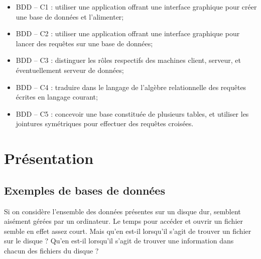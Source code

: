 \documentclass[10pt]{article}
\newif\ifxp
\begin{document}
\ifxp

\else

\fi



 \renewcommand{\baselinestretch}{1.2}
\setlength{\parskip}{2ex plus 0.5ex minus 0.2ex}

\vspace{.5cm}

\begin{savoir}
\begin{itemize}
\item BDD -- C1 : utiliser une application offrant une interface graphique pour créer une base de données et l’alimenter;
\item BDD -- C2 : utiliser une application offrant une interface graphique pour lancer des requêtes sur une base de données;
\item BDD -- C3 : distinguer les rôles respectifs des machines client, serveur, et éventuellement serveur de données;
\item BDD -- C4 : traduire dans le langage de l’algèbre relationnelle des requêtes écrites en langage courant;
\item BDD -- C5 : concevoir une base constituée de plusieurs tables, et utiliser les jointures symétriques pour effectuer des requêtes croisées.
\end{itemize}
\end{savoir}



\setlength{\parskip}{0ex plus 0.2ex minus 0ex}
 \renewcommand{\contentsname}{}
 \renewcommand{\baselinestretch}{1}

\tableofcontents

 \renewcommand{\baselinestretch}{1.2}
\setlength{\parskip}{2ex plus 0.5ex minus 0.2ex}




\section{Présentation}
\subsection{Exemples de bases de données}
Si on considère l'ensemble des données présentes sur un disque dur, semblent aisément gérées par un ordinateur. Le temps pour accéder et ouvrir un fichier semble en effet assez court. Mais qu'en est-il lorsqu'il s'agit de trouver un fichier sur le disque ? Qu'en est-il lorsqu'il s'agit de trouver une information dans chacun des fichiers du disque ?
\end{document}
